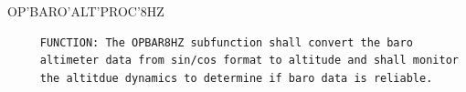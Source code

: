 \begin{frame}
OP'BARO'ALT'PROC'8HZ
\begin{verbatim}
     FUNCTION: The OPBAR8HZ subfunction shall convert the baro
     altimeter data from sin/cos format to altitude and shall monitor
     the altitdue dynamics to determine if baro data is reliable.


\end{verbatim}
\end{frame}
